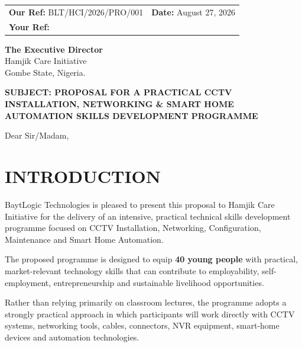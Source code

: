 \documentclass[11pt,a4paper]{article}
\begin{document}
\begin{tabularx}{\textwidth}{@{}X r@{}}
\textbf{Our Ref:} BLT/HCI/2026/PRO/001 & \textbf{Date:} August 27, 2026 \\
\textbf{Your Ref:} \underline{\hspace{4cm}} & \\
\end{tabularx}

\vspace{15pt}

\begin{tcolorbox}[calloutbox]
\textbf{The Executive Director}\\
Hamjik Care Initiative\\
Gombe State, Nigeria.
\end{tcolorbox}

\vspace{10pt}

\begin{tcolorbox}[themebox]
    \Large \textbf{SUBJECT: PROPOSAL FOR A PRACTICAL CCTV INSTALLATION, NETWORKING \& SMART HOME AUTOMATION SKILLS DEVELOPMENT PROGRAMME}
\end{tcolorbox}

\vspace{10pt}

\noindent Dear Sir/Madam,

\section{INTRODUCTION}
BaytLogic Technologies is pleased to present this proposal to Hamjik Care Initiative for the delivery of an intensive, practical technical skills development programme focused on CCTV Installation, Networking, Configuration, Maintenance and Smart Home Automation.

The proposed programme is designed to equip \textbf{40 young people} with practical, market-relevant technology skills that can contribute to employability, self-employment, entrepreneurship and sustainable livelihood opportunities.

Rather than relying primarily on classroom lectures, the programme adopts a strongly practical approach in which participants will work directly with CCTV systems, networking tools, cables, connectors, NVR equipment, smart-home devices and automation technologies.
\end{document}
